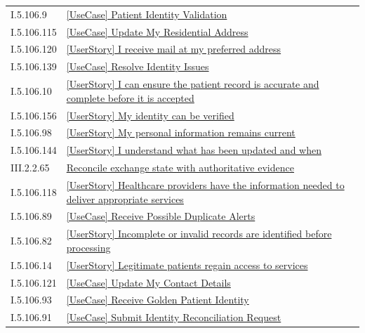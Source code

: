 \begin{longtable}{p{.22\linewidth}p{.73\linewidth}}
I.5.106.9 & \hyperref[element:012ef5e4c0e24dad8f392d252927141a]{[UseCase] Patient Identity Validation} \\
I.5.106.115 & \hyperref[element:01448ef3270f46cba0322ef2e263b7e1]{[UseCase] Update My Residential Address} \\
I.5.106.120 & \hyperref[element:01bf8149974a48c0a67913eb97c383b5]{[UserStory] I receive mail at my preferred address} \\
I.5.106.139 & \hyperref[element:01fd9730ef0b402f864abecfca77c1fd]{[UseCase] Resolve Identity Issues} \\
I.5.106.10 & \hyperref[element:03136fcf59b047c6b4399fd2637f4260]{[UserStory] I can ensure the patient record is accurate and complete before it is accepted} \\
I.5.106.156 & \hyperref[element:03fd6db241944e1abf64a839f787efe1]{[UserStory] My identity can be verified} \\
I.5.106.98 & \hyperref[element:040f61f019fe42858ad9a83c5368c13e]{[UserStory] My personal information remains current} \\
I.5.106.144 & \hyperref[element:07b9c04c3b854644a5c61dc4e994ba59]{[UserStory] I understand what has been updated and when} \\
III.2.2.65 & \hyperref[element:08c2d05dd0174cc28288ed4ab0bc05d2]{Reconcile exchange state with authoritative evidence} \\
I.5.106.118 & \hyperref[element:0bb01aca6ec24db99b72b2b960cfee09]{[UserStory] Healthcare providers have the information needed to deliver appropriate services} \\
I.5.106.89 & \hyperref[element:0d908318a04f4fff876814e44c6b0b6d]{[UseCase] Receive Possible Duplicate Alerts} \\
I.5.106.82 & \hyperref[element:0ec4214d9d2e4f39a5c0b73fca925ddf]{[UserStory] Incomplete or invalid records are identified before processing} \\
I.5.106.14 & \hyperref[element:0f58526c44394c7bb691d2fcb4b3f662]{[UserStory] Legitimate patients regain access to services} \\
I.5.106.121 & \hyperref[element:124ea221e66c46e9a29dedfd0cccc7d8]{[UseCase] Update My Contact Details} \\
I.5.106.93 & \hyperref[element:13ca72447fca40d988da130123fef0f1]{[UseCase] Receive Golden Patient Identity} \\
I.5.106.91 & \hyperref[element:14f4385bb94b4dba9814d59b83693565]{[UseCase] Submit Identity Reconciliation Request} \\

\end{longtable}
